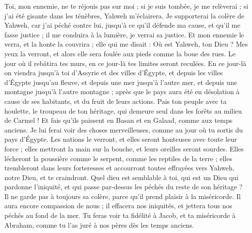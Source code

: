 \begin{multicols}{2}
Toi, mon ennemie, ne te réjouis pas sur moi ; si je suis tombée, je me relèverai ; si j'ai été gisante dans les ténèbres, Yahweh m'éclairera.
Je supporterai la colère de Yahweh, car j'ai péché contre lui, jusqu'à ce qu'il défende ma cause, et qu'il me fasse justice ; il me conduira à la lumière, je verrai sa justice.
Et mon ennemie le verra, et la honte la couvrira ; elle qui me disait : Où est Yahweh, ton Dieu ? Mes yeux la verront, et alors elle sera foulée aux pieds comme la boue des rues.
Le jour où il rebâtira tes murs, en ce jour-là tes limites seront reculées.
En ce jour-là on viendra jusqu'à toi d'Assyrie et des villes d'Égypte, et depuis les villes d'Égypte jusqu'au fleuve, et depuis une mer jusqu'à l'autre mer, et depuis une montagne jusqu'à l'autre montagne ;
après que le pays aura été en désolation à cause de ses habitants, et du fruit de leurs actions.
Pais ton peuple avec ta houlette, le troupeau de ton héritage, qui demeure seul dans les forêts au milieu de Carmel ! Et fais qu'ils paissent en Basan et en Galaad, comme aux temps anciens.
Je lui ferai voir des choses merveilleuses, comme au jour où tu sortis du pays d'Égypte.
Les nations le verront, et elles seront honteuses avec toute leur force ; elles mettront la main sur la bouche, et leurs oreilles seront sourdes.
Elles lécheront la poussière comme le serpent, comme les reptiles de la terre ; elles trembleront dans leurs forteresses et accourront toutes effrayées vers Yahweh, notre Dieu, et te craindront.
Quel dieu est semblable à toi, qui est un Dieu qui pardonne l'iniquité, et qui passe par-dessus les péchés du reste de son héritage ? Il ne garde pas à toujours sa colère, parce qu'il prend plaisir à la miséricorde.
Il aura encore compassion de nous ; il effacera nos iniquités, et jettera tous nos péchés au fond de la mer.
Tu feras voir ta fidélité à Jacob, et ta miséricorde à Abraham, comme tu l’as juré à nos pères dès les temps anciens.
\PPE{}
\end{multicols}
